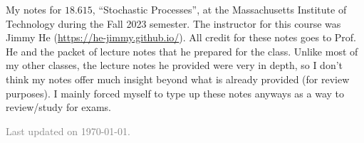 \documentclass[11pt]{article}
\begin{document}
\maketitle

My notes for $18.615$, ``Stochastic Processes'', at the Massachusetts Institute of Technology during the Fall 2023 semester. The instructor for this course was Jimmy He (\url{https://he-jimmy.github.io/}). All credit for these notes goes to Prof. He and the packet of lecture notes that he prepared for the class. Unlike most of my other classes, the lecture notes he provided were very in depth, so I don't think my notes offer much insight beyond what is already provided (for review purposes). I mainly forced myself to type up these notes anyways as a way to review/study for exams. 



\vfill

\hfill \textcolor{gray}{\small Last updated on \today.}
\newpage
\tableofcontents 
\newpage
\importfiles %
\end{document}
